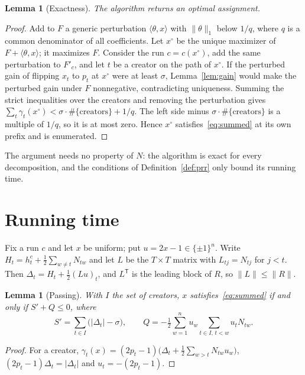 \documentclass[11pt,a4paper]{article}
\newtheorem{lemma}[theorem]{Lemma}
\theoremstyle{definition}
\theoremstyle{remark}
\begin{document}
\begin{lemma}[Exactness]\label{lem:exact}
The algorithm returns an optimal assignment.
\end{lemma}

\begin{proof}
Add to $F$ a generic perturbation $\langle\theta,x\rangle$ with $\|\theta\|_1$ below
$1/q$, where $q$ is a common denominator of all coefficients. Let $x^\circ$
be the unique maximizer of $F+\langle\theta,x\rangle$; it maximizes $F$. Consider
the run $c=c(x^\circ)$, add the same perturbation to $F'_c$, and let $t$ be a
creator on the path of $x^\circ$. If the perturbed gain of flipping $x_t$ to
$p_t$ at $x^\circ$ were at least $\sigma$, Lemma~\ref{lem:gain} would make the
perturbed gain under $F$ nonnegative, contradicting uniqueness. Summing the
strict inequalities over the creators and removing the perturbation gives
$\sum_t\gamma_t(x^\circ)<\sigma\cdot\#\{\text{creators}\}+1/q$. The left side
minus $\sigma\cdot\#\{\text{creators}\}$ is a multiple of $1/q$, so it is at
most zero. Hence $x^\circ$ satisfies~\eqref{eq:summed} at its own prefix and
is enumerated.
\end{proof}

The argument needs no property of $N$: the algorithm is exact for every
decomposition, and the conditions of Definition~\ref{def:prr} only bound its
running time.

\section{Running time}\label{sec:time}

Fix a run $c$ and let $x$ be uniform; put $u=2x-1\in\{\pm1\}^n$. Write $H_t=
h^c_t+\frac12\sum_{w\ne t}N_{tw}$ and let $L$ be the $T\times T$ matrix with
$L_{tj}=N_{tj}$ for $j<t$. Then $\Delta_t=H_t+\frac12(Lu)_t$, and
$L^{\mathsf T}$ is the leading block of $R$, so $\|L\|\le\|R\|$.

\begin{lemma}[Passing]\label{lem:pass}
With $I$ the set of creators, $x$ satisfies~\eqref{eq:summed} if and only if
$S'+Q\le0$, where
\[
 S'=\sum_{t\in I}\bigl(|\Delta_t|-\sigma\bigr),\qquad
 Q=-\tfrac12\sum_{w=1}^nu_w\sum_{t\in I,\,t<w}u_tN_{tw}.
\]
\end{lemma}

\begin{proof}
For a creator, $\gamma_t(x)=(2p_t-1)\bigl(\Delta_t+\frac12\sum_{w>t}
N_{tw}u_w\bigr)$, $(2p_t-1)\Delta_t=|\Delta_t|$ and $u_t=-(2p_t-1)$.
\end{proof}
\end{document}
